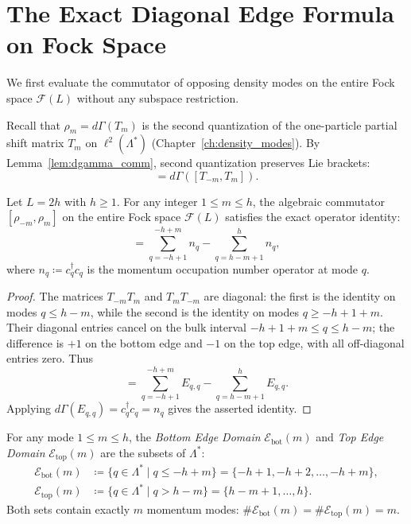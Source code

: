 \section{The Exact Diagonal Edge Formula on Fock Space}

We first evaluate the commutator of opposing density modes on the entire Fock space $\mathcal{F}(L)$ without any subspace restriction.

Recall that $\rho_m = d\Gamma(T_m)$ is the second quantization of the one-particle partial shift matrix $T_m$ on $\ell^2(\Lambda^*)$ (Chapter~\ref{ch:density_modes}). By Lemma~\ref{lem:dgamma_comm}, second quantization preserves Lie brackets:
\begin{equation}
[\rho_{-m}, \rho_m] = d\Gamma([T_{-m}, T_m]).
\end{equation}

\begin{theorem}
\label{thm:diagonal_edge_formula}
Let $L = 2h$ with $h \ge 1$. For any integer $1 \le m \le h$, the algebraic commutator $[\rho_{-m}, \rho_m]$ on the entire Fock space $\mathcal{F}(L)$ satisfies the exact operator identity:
\begin{equation}
[\rho_{-m}, \rho_m] = \sum_{q = -h+1}^{-h+m} n_q - \sum_{q = h-m+1}^{h} n_q,
\end{equation}
where $n_q \coloneqq c_q^\dagger c_q$ is the momentum occupation number operator at mode $q$.
\end{theorem}

\begin{proof}
The matrices $T_{-m}T_m$ and $T_mT_{-m}$ are diagonal: the first is the identity on modes $q\le h-m$, while the second is the identity on modes $q\ge-h+1+m$. Their diagonal entries cancel on the bulk interval $-h+1+m\le q\le h-m$; the difference is $+1$ on the bottom edge and $-1$ on the top edge, with all off-diagonal entries zero. Thus
\begin{equation}
[T_{-m},T_m]=\sum_{q=-h+1}^{-h+m}E_{q,q}-\sum_{q=h-m+1}^{h}E_{q,q}.
\end{equation}
Applying $d\Gamma(E_{q,q})=c_q^\dagger c_q=n_q$ gives the asserted identity.
\end{proof}

\begin{definition}
For any mode $1 \le m \le h$, the \emph{Bottom Edge Domain} $\mathcal{E}_{\mathrm{bot}}(m)$ and \emph{Top Edge Domain} $\mathcal{E}_{\mathrm{top}}(m)$ are the subsets of $\Lambda^*$:
\begin{align}
\mathcal{E}_{\mathrm{bot}}(m) &\coloneqq \{ q \in \Lambda^* \mid q \le -h + m \} = \{-h+1, -h+2, \dots, -h+m\}, \\
\mathcal{E}_{\mathrm{top}}(m) &\coloneqq \{ q \in \Lambda^* \mid q > h - m \} = \{h - m + 1, \dots, h\}.
\end{align}
Both sets contain exactly $m$ momentum modes: $\#\mathcal{E}_{\mathrm{bot}}(m) = \#\mathcal{E}_{\mathrm{top}}(m) = m$.
\end{definition}

